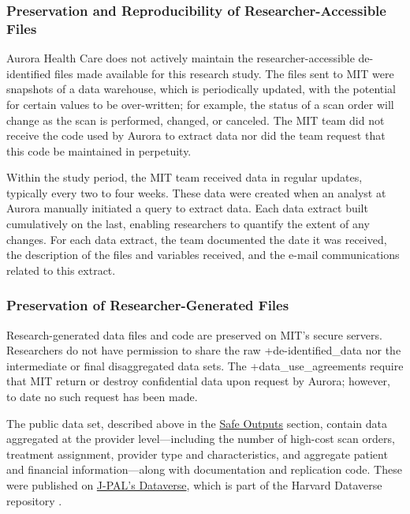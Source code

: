 \documentclass[
]{WileySix}
\begin{document}
\hypertarget{preservation-and-reproducibility-of-researcher-accessible-files-3}{%
\subsubsection{Preservation and Reproducibility of Researcher-Accessible Files}\label{preservation-and-reproducibility-of-researcher-accessible-files-3}}

Aurora Health Care does not actively maintain the researcher-accessible de-identified files made available for this research study. The files sent to MIT were snapshots of a data warehouse, which is periodically updated, with the potential for certain values to be over-written; for example, the status of a scan order will change as the scan is performed, changed, or canceled. The MIT team did not receive the code used by Aurora to extract data nor did the team request that this code be maintained in perpetuity.

Within the study period, the MIT team received data in regular updates, typically every two to four weeks. These data were created when an analyst at Aurora manually initiated a query to extract data. Each data extract built cumulatively on the last, enabling researchers to quantify the extent of any changes. For each data extract, the team documented the date it was received, the description of the files and variables received, and the e-mail communications related to this extract.

\hypertarget{preservation-of-researcher-generated-files}{%
\subsubsection{Preservation of Researcher-Generated Files}\label{preservation-of-researcher-generated-files}}

Research-generated data files and code are preserved on MIT's secure servers. Researchers do not have permission to share the raw +de-identified\_data\textbar{} nor the intermediate or final disaggregated data sets. The +data\_use\_agreements\textbar{} require that MIT return or destroy confidential data upon request by Aurora; however, to date no such request has been made.

The public data set, described above in the \protect\hyperlink{safe-outputs-8}{Safe Outputs} section, contain data aggregated at the provider level---including the number of high-cost scan orders, treatment assignment, provider type and characteristics, and aggregate patient and financial information---along with documentation and replication code. These were published on \href{https://doi.org/10.7910/DVN/BRKDVQ}{J-PAL's Dataverse}, which is part of the Harvard Dataverse repository \citep{doyle2018}.
\end{document}
